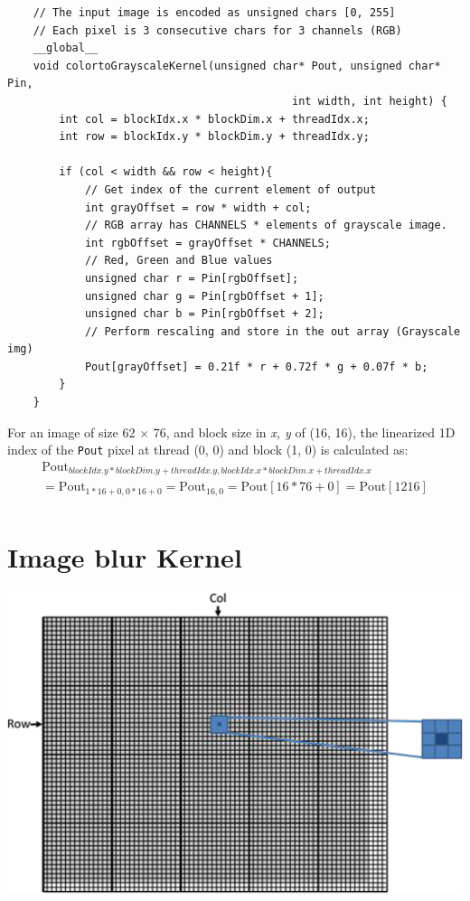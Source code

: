 \begin{verbatim}
    // The input image is encoded as unsigned chars [0, 255]
    // Each pixel is 3 consecutive chars for 3 channels (RGB)
    __global__
    void colortoGrayscaleKernel(unsigned char* Pout, unsigned char* Pin, 
                                            int width, int height) {
        int col = blockIdx.x * blockDim.x + threadIdx.x;
        int row = blockIdx.y * blockDim.y + threadIdx.y;

        if (col < width && row < height){
            // Get index of the current element of output
            int grayOffset = row * width + col;
            // RGB array has CHANNELS * elements of grayscale image.
            int rgbOffset = grayOffset * CHANNELS;
            // Red, Green and Blue values
            unsigned char r = Pin[rgbOffset];
            unsigned char g = Pin[rgbOffset + 1];
            unsigned char b = Pin[rgbOffset + 2];
            // Perform rescaling and store in the out array (Grayscale img)
            Pout[grayOffset] = 0.21f * r + 0.72f * g + 0.07f * b; 
        }
    }
\end{verbatim}
\bigskip
For an image of size 62 $\times$ 76, and block size in \textit{x, y} of (16, 16), the linearized 1D index of the \texttt{Pout} pixel at thread (0, 0) and block (1, 0) is calculated as:
\begin{equation*}
    \begin{aligned}
        \text{Pout}_{blockIdx.y *blockDim.y + threadIdx.y , blockIdx.x*blockDim.x + threadIdx.x} \\
        = \text{Pout}_{1*16+0, 0*16+0} = \text{Pout}_{16,0} = \text{Pout}[16*76+0] = \text{Pout}[1216]
        \\\end{aligned}
\end{equation*}

\section{Image blur Kernel}
\begin{center}
    \includegraphics[width=0.6\linewidth]{Images/MultiDim_Grid/image_blur.png}
\end{center}
